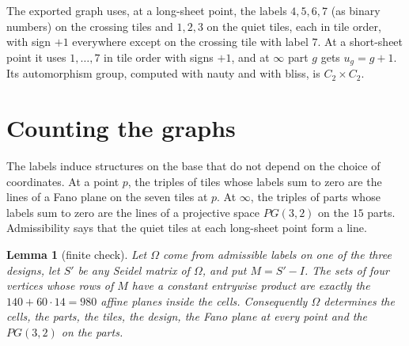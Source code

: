 \documentclass[11pt]{amsart}
\newtheorem{lemma}[theorem]{Lemma}
\theoremstyle{remark}
\begin{document}
The exported graph uses, at a long-sheet point, the labels $4,5,6,7$ (as binary numbers) on the crossing tiles and $1,2,3$ on the quiet tiles, each in tile order, with sign $+1$ everywhere except on the crossing tile with label $7$. At a short-sheet point it uses $1,\dots,7$ in tile order with signs $+1$, and at $\infty$ part $g$ gets $u_g=g+1$. Its automorphism group, computed with nauty and with bliss, is $C_2\times C_2$.

\section{Counting the graphs}\label{sec:count}

The labels induce structures on the base that do not depend on the choice of coordinates. At a point $p$, the triples of tiles whose labels sum to zero are the lines of a Fano plane on the seven tiles at $p$. At $\infty$, the triples of parts whose labels sum to zero are the lines of a projective space $PG(3,2)$ on the $15$ parts. Admissibility says that the quiet tiles at each long-sheet point form a line.

\begin{lemma}[finite check]\label{lem:recovery}
Let $\Omega$ come from admissible labels on one of the three designs, let $S'$ be any Seidel matrix of $\Omega$, and put $M=S'-I$. The sets of four vertices whose rows of $M$ have a constant entrywise product are exactly the $140+60\cdot14=980$ affine planes inside the cells. Consequently $\Omega$ determines the cells, the parts, the tiles, the design, the Fano plane at every point and the $PG(3,2)$ on the parts.
\end{lemma}
\end{document}
